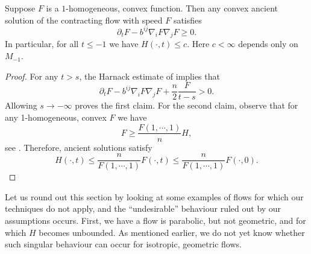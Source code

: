 \documentclass{amsart}
\begin{document}
\begin{proposition}
\label{cor:boundedH}

Suppose $F$ is a \(1\)-homogeneous, convex function. Then any convex ancient solution of the contracting flow with speed $F$ satisfies
\[\partial_t F-b^{ij}\nabla_i F \nabla_j F \geq 0.\]
In particular, for all $t\le -1$ we have
$H(\cdot,t)\leq c.$
Here $c<\infty$ depends only on $M_{-1}.$
\end{proposition}

\begin{proof}
For any $t>s$, the  Harnack estimate of \cite[Theorem 1]{bryan2015harnack} implies that
$$\partial_t F-b^{ij}\nabla_i F\nabla_j F+\frac{n}{2}\frac{F}{t-s}>0.$$
Allowing $s\to-\infty$ proves the first claim. For the second claim, observe that for any 1-homogeneous, convex $F$ we have \[F\ge \frac{F(1,\cdots,1)}{n}H,\]
see \cite[Chapter 2]{Gerhardt:/2006}. Therefore, ancient solutions satisfy
\[H(\cdot,t)\leq \frac{n}{F(1,\cdots,1)}F(\cdot,t)\leq \frac{n}{F(1,\cdots,1)}F(\cdot,0). \]
\end{proof}

Let us round out this section by looking at some examples of flows for which our techniques do not apply, and the ``undesirable'' behaviour ruled out by our assumptions occurs. First, we have a flow is parabolic, but not geometric, and for which \(H\) becomes unbounded. As mentioned earlier, we do not yet know whether such singular behaviour can occur for isotropic, geometric flows.
\end{document}
